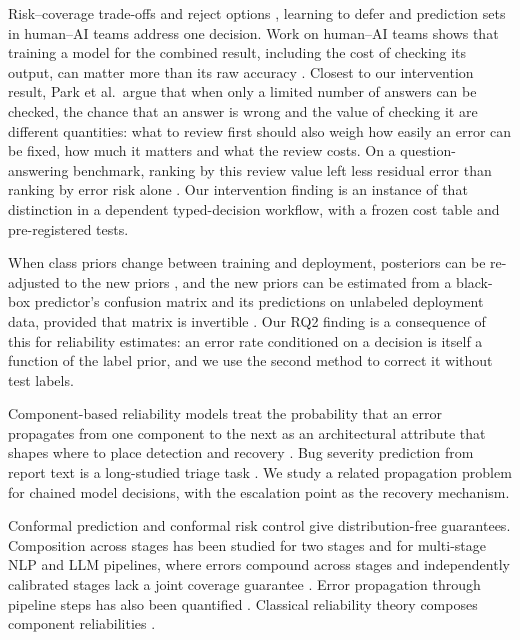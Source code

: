  Risk--coverage trade-offs
and reject options \citep{elyaniv2010selective,geifman2017selective,geifman2019selectivenet},
learning to defer \citep{madras2018predict,mozannar2020defer} and
prediction sets in human--AI teams \citep{babbar2022predsets} address
one decision. Work on human--AI teams shows that training a model
for the combined result, including the cost of checking its output, can
matter more than its raw accuracy \citep{bansal2021teammate}.
Closest to our intervention result, Park et al.\ argue that when only a
limited number of answers can be checked, the chance that an answer is
wrong and the value of checking it are different quantities: what to
review first should also weigh how easily an error can be fixed, how much
it matters and what the review costs. On a question-answering benchmark,
ranking by this review value left less residual error than ranking by
error risk alone \citep{park2026riskreview}. Our
intervention finding is an instance of that distinction in a dependent
typed-decision workflow, with a frozen cost table and pre-registered
tests.

 When class priors change between training and
deployment, posteriors can be re-adjusted to the new priors
\citep{saerens2002adjusting}, and the new priors can be estimated from a
black-box predictor's confusion matrix and its predictions on unlabeled
deployment data, provided that matrix is invertible
\citep{lipton2018bbse}. Our RQ2 finding is a consequence of this for
reliability estimates: an error rate conditioned on a decision is itself
a function of the label prior, and we use the second method to correct it
without test labels.

 Component-based
reliability models treat the probability that an error propagates from
one component to the next as an architectural attribute that shapes where
to place detection and recovery \citep{cortellessa2007errorprop}. Bug
severity prediction from report text is a long-studied triage task
\citep{lamkanfi2010severity}. We study a related propagation problem for
chained model decisions, with the escalation point as the recovery
mechanism.

 Conformal prediction
\citep{angelopoulos2021gentle} and conformal risk control
\citep{angelopoulos2024crc} give distribution-free guarantees. Composition
across stages has been studied for two stages \citep{zhang2025modular}
and for multi-stage NLP and LLM pipelines, where errors compound across
stages and independently calibrated stages lack a joint coverage
guarantee \citep{kotte2026pasc}.
Error propagation through pipeline steps has also been quantified
\citep{chowdhury2019error}. Classical reliability theory composes
component reliabilities \citep{barlow1965reliability}.

